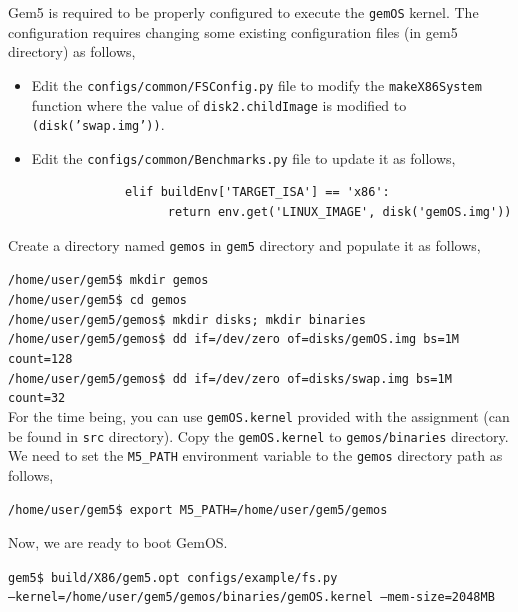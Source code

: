 \documentclass[12pt]{article}
\begin{document}
{Gem5 is required to be properly configured to execute the \texttt{gemOS} kernel. 
The configuration requires changing
some existing configuration files (in gem5 directory) as follows,
\begin{itemize}
   \item Edit the \texttt{configs/common/FSConfig.py} file to modify the \texttt{makeX86System} function
         where the value of \texttt{disk2.childImage} is modified to \texttt{(disk('swap.img'))}.
   \item Edit the \texttt{configs/common/Benchmarks.py} file to update it as follows, 
         \begin{verbatim}
             elif buildEnv['TARGET_ISA'] == 'x86':
                   return env.get('LINUX_IMAGE', disk('gemOS.img'))
         \end{verbatim}
\end{itemize}
\noindent
Create a directory named \texttt{gemos} in \texttt{gem5} directory and populate it as follows,

\vspace{0.25cm}
\noindent
\texttt{/home/user/gem5\$ mkdir gemos} \\
\texttt{/home/user/gem5\$ cd gemos} \\
\texttt{/home/user/gem5/gemos\$ mkdir disks; mkdir binaries} \\
\texttt{/home/user/gem5/gemos\$ dd if=/dev/zero of=disks/gemOS.img bs=1M count=128} \\
\texttt{/home/user/gem5/gemos\$ dd if=/dev/zero of=disks/swap.img bs=1M count=32} \\



%
For the time being, you can use \texttt{gemOS.kernel} provided with the assignment (can be found in {\tt src} directory). 
Copy the \texttt{gemOS.kernel} to {\tt gemos/binaries} directory.\\
%
We need to set the \texttt{M5\_PATH} environment variable to the \texttt{gemos} directory path as follows,


\vspace{0.25cm}
\noindent
\texttt{/home/user/gem5\$ export M5\_PATH=/home/user/gem5/gemos}
 
\vspace{0.25cm}
\noindent
Now, we are ready to boot GemOS.

\vspace{0.25cm}
\noindent
\texttt{gem5\$ build/X86/gem5.opt configs/example/fs.py} \\ {\tt --kernel=/home/user/gem5/gemos/binaries/gemOS.kernel --mem-size=2048MB}

}
\end{document}

